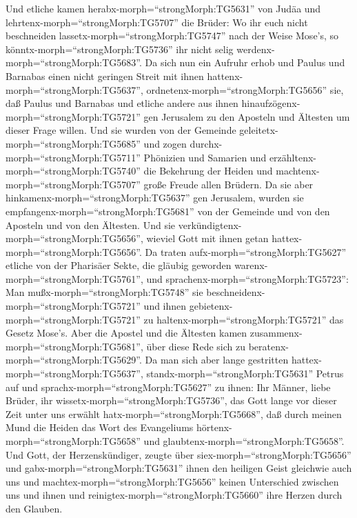  Und etliche kamen herabx-morph=``strongMorph:TG5631'' von
Judäa und lehrtenx-morph=``strongMorph:TG5707'' die Brüder: Wo ihr euch
nicht beschneiden lassetx-morph=``strongMorph:TG5747'' nach der Weise
Mose's, so könntx-morph=``strongMorph:TG5736'' ihr nicht selig
werdenx-morph=``strongMorph:TG5683''.  Da sich nun ein
Aufruhr erhob und Paulus und Barnabas einen nicht geringen Streit mit
ihnen hattenx-morph=``strongMorph:TG5637'',
ordnetenx-morph=``strongMorph:TG5656'' sie, daß Paulus und Barnabas und
etliche andere aus ihnen hinaufzögenx-morph=``strongMorph:TG5721'' gen
Jerusalem zu den Aposteln und Ältesten um dieser Frage willen.
 Und sie wurden von der Gemeinde
geleitetx-morph=``strongMorph:TG5685'' und zogen
durchx-morph=``strongMorph:TG5711'' Phönizien und Samarien und
erzähltenx-morph=``strongMorph:TG5740'' die Bekehrung der Heiden und
machtenx-morph=``strongMorph:TG5707'' große Freude allen Brüdern.
 Da sie aber hinkamenx-morph=``strongMorph:TG5637'' gen
Jerusalem, wurden sie empfangenx-morph=``strongMorph:TG5681'' von der
Gemeinde und von den Aposteln und von den Ältesten. Und sie
verkündigtenx-morph=``strongMorph:TG5656'', wieviel Gott mit ihnen getan
hattex-morph=``strongMorph:TG5656''.  Da traten
aufx-morph=``strongMorph:TG5627'' etliche von der Pharisäer Sekte, die
gläubig geworden warenx-morph=``strongMorph:TG5761'', und
sprachenx-morph=``strongMorph:TG5723'': Man
mußx-morph=``strongMorph:TG5748'' sie
beschneidenx-morph=``strongMorph:TG5721'' und ihnen
gebietenx-morph=``strongMorph:TG5721'' zu
haltenx-morph=``strongMorph:TG5721'' das Gesetz Mose's. 
Aber die Apostel und die Ältesten kamen
zusammenx-morph=``strongMorph:TG5681'', über diese Rede sich zu
beratenx-morph=``strongMorph:TG5629''.  Da man sich aber
lange gestritten hattex-morph=``strongMorph:TG5637'',
standx-morph=``strongMorph:TG5631'' Petrus auf und
sprachx-morph=``strongMorph:TG5627'' zu ihnen: Ihr Männer, liebe Brüder,
ihr wissetx-morph=``strongMorph:TG5736'', das Gott lange vor dieser Zeit
unter uns erwählt hatx-morph=``strongMorph:TG5668'', daß durch meinen
Mund die Heiden das Wort des Evangeliums
hörtenx-morph=``strongMorph:TG5658'' und
glaubtenx-morph=``strongMorph:TG5658''.  Und Gott, der
Herzenskündiger, zeugte über siex-morph=``strongMorph:TG5656'' und
gabx-morph=``strongMorph:TG5631'' ihnen den heiligen Geist gleichwie
auch uns  und machtex-morph=``strongMorph:TG5656'' keinen
Unterschied zwischen uns und ihnen und
reinigtex-morph=``strongMorph:TG5660'' ihre Herzen durch den Glauben.

